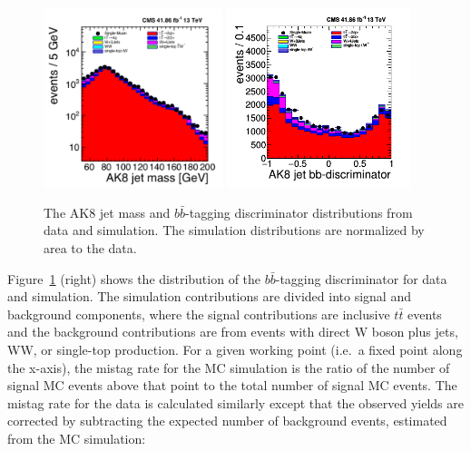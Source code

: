 \begin{figure}
\centering
\includegraphics[width=0.465\textwidth]{figs/ak8jetmass.png}
\includegraphics[width=0.48\textwidth]{figs/ak8jetbbdisc.png}
\caption[The AK8 jet mass and $b\bar{b}$-tagging discriminator distributions from data and simulation.]{The AK8 jet mass and $b\bar{b}$-tagging discriminator distributions from data and simulation. The simulation distributions are normalized by area to the data.}
\label{fig:dists}
\end{figure}

Figure~\ref{fig:dists} (right) shows the distribution of the $b\bar{b}$-tagging discriminator for data and simulation. The simulation contributions are divided into signal  and background components, where the signal contributions are inclusive $t\bar{t}$ events and the background contributions are from events with direct W boson plus jets, WW, or single-top production.  For a given working point (i.e.\ a fixed point along the x-axis), the mistag rate for the MC simulation is the ratio of the number of signal MC events above that point to the total number of signal MC events. The mistag rate for the data is calculated similarly except that the observed yields are corrected by subtracting the expected number of background events, estimated from the MC simulation:

